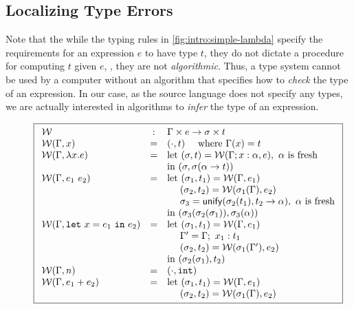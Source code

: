 \subsection{Localizing Type Errors}
\label{sec:localizing-type-errors}

Note that the while the typing rules in
\autoref{fig:intro:simple-lambda} specify the requirements for an
expression $e$ to have type $t$, they do not dictate a procedure for
computing $t$ given $e$, \ie, they are not \emph{algorithmic}.
%
Thus, a type system cannot be used by a computer without an algorithm
that specifies how to \emph{check} the type of an expression.
%
In our case, as the source language does not specify any types, we are
actually interested in algorithms to \emph{infer} the type of an
expression.

\begin{figure}
\centering
\[
\boxed{
\begin{array}{lcl}
\W & : & \Gamma \times e \rightarrow \sigma \times t \\
\W(\Gamma, x)
   & = & (\cdot, t) \quad \text{ where } \Gamma(x) = t \\
\W(\Gamma, \efun{x}{e})
   & = & \text{let } (\sigma, t) = \W(\Gamma;x:\alpha, e),\ \alpha \text{ is fresh} \\
   &   & \text{in  } (\sigma, \sigma(\tarr{\alpha}{t})) \\
\W(\Gamma, \eapp{e_1}{e_2})
   & = & \text{let } (\sigma_1, t_1) = \W(\Gamma, e_1) \\
   &   & \quad\ (\sigma_2, t_2) = \W(\sigma_1(\Gamma), e_2) \\
   &   & \quad\ \sigma_3 = \unify{\sigma_2(t_1)}{\tarr{t_2}{\alpha}},\ \alpha \text{ is fresh} \\
   &   & \text{in } (\sigma_3(\sigma_2(\sigma_1)), \sigma_3(\alpha)) \\
\W(\Gamma, \elet{x}{e_1}{e_2})
   & = & \text{let } (\sigma_1, t_1) = \W(\Gamma, e_1) \\
   &   & \quad\ \Gamma' = \Gamma;\ x_1:t_1 \\
   &   & \quad\ (\sigma_2, t_2) = \W(\sigma_1(\Gamma'), e_2) \\
   &   & \text{in } (\sigma_2(\sigma_1), t_2) \\
\W(\Gamma, n)
   & = & (\cdot, \tint) \\
\W(\Gamma, \eplus{e_1}{e_2})
   & = & \text{let } (\sigma_1, t_1) = \W(\Gamma, e_1) \\
   &   & \quad\ (\sigma_2, t_2) = \W(\sigma_1(\Gamma), e_2) \\

\end{array}}\]
\end{figure}
